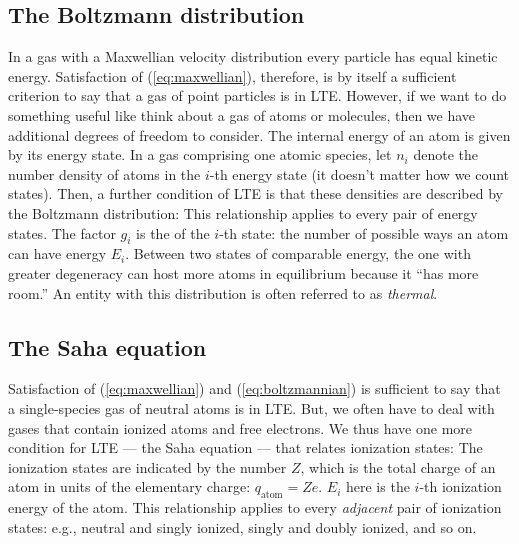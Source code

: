 \subsection{The Boltzmann distribution}
In a gas with a Maxwellian velocity distribution every particle has equal kinetic energy. Satisfaction of (\ref{eq:maxwellian}), therefore, is by itself a sufficient criterion to say that a gas of point particles is in LTE. However, if we want to do something useful like think about a gas of atoms or molecules, then we have additional degrees of freedom to consider. The internal energy of an atom is given by its energy state. In a gas comprising one atomic species, let $n_i$ denote the number density of atoms in the $i$-th energy state (it doesn't matter how we count states). Then, a further condition of LTE is that these densities are described by the Boltzmann distribution:
This relationship applies to every pair of energy states. The factor $g_i$ is the  of the $i$-th state: the number of possible ways an atom can have energy $E_i$. Between two states of comparable energy, the one with greater degeneracy can host more atoms in equilibrium because it ``has more room.'' An entity with this distribution is often referred to as \textit{thermal}.

\subsection{The Saha equation}
Satisfaction of (\ref{eq:maxwellian}) and (\ref{eq:boltzmannian}) is sufficient to say that a single-species gas of neutral atoms is in LTE. But, we often have to deal with gases that contain ionized atoms and free electrons. We thus have one more condition for LTE --- the Saha equation --- that relates ionization states:
The ionization states are indicated by the number $Z$, which is the total charge of an atom in units of the elementary charge: $q_\text{atom} = Ze$. $E_i$ here is the $i$-th ionization energy of the atom. This relationship applies to every \textit{adjacent} pair of ionization states: e.g., neutral and singly ionized, singly and doubly ionized, and so on.


